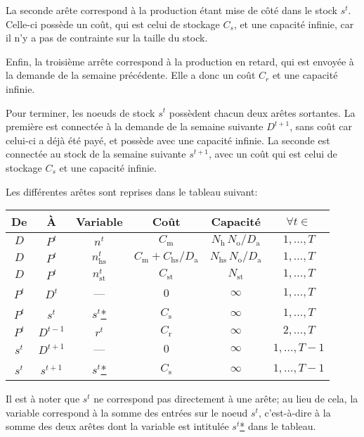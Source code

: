 La seconde arête correspond à la production étant mise de côté dans le stock $s^t$. Celle-ci possède un coût, qui est celui de stockage $C_s$, et une capacité infinie, car il n'y a pas de contrainte sur la taille du stock.

Enfin, la troisième arrête correspond à la production en retard, qui est envoyée à la demande de la semaine précédente. Elle a donc un coût $C_r$ et une capacité infinie.

Pour terminer, les noeuds de stock $s^t$ possèdent chacun deux arêtes sortantes. La première est connectée à la demande de la semaine suivante $D^{t+1}$, sans coût car celui-ci a déjà été payé, et possède avec une capacité infinie. La seconde est connectée au stock de la semaine suivante $s^{t+1}$, avec un coût qui est celui de stockage $C_s$ et une capacité infinie.

Les différentes arêtes sont reprises dans le tableau suivant:
\begin{center}
\begin{tabular}{cc|c|cc|c}
    \textbf{De} & \textbf{À} & \textbf{Variable} & \textbf{Coût} & \textbf{Capacité} & $\forall t \in$ \\
    \hline
    $D$ & $P^t$ &
    $n^t$ & $C_\mathrm{m}$ & $N_\mathrm{h}\,N_\mathrm{o}/D_\mathrm{a}$
    & $1,\dots,T$ \\
    \hline
    $D$ & $P^t$ &
    $n_\mathrm{hs}^t$ & $C_\mathrm{m}+C_\mathrm{hs}/D_\mathrm{a}$ & $N_\mathrm{hs}\,N_\mathrm{o}/D_\mathrm{a}$
    & $1,\dots,T$ \\
    \hline
    $D$ & $P^t$ &
    $n_\mathrm{st}^t$ & $C_\mathrm{st}$ & $N_\mathrm{st}$
    & $1,\dots,T$ \\
    
    \hline
    $P^t$ & $D^t$ &
    --- & $0$ & $\infty$
    & $1,\dots,T$ \\
    \hline
    $P^t$ & $s^t$ &
    $s^t$\;\underline{*} & $C_\mathrm{s}$ & $\infty$
    & $1,\dots,T$ \\
    \hline
    $P^t$ & $D^{t-1}$ &
    $r^t$ & $C_\mathrm{r}$ & $\infty$
    & $2,\dots,T$ \\
    
    \hline
    $s^t$ & $D^{t+1}$ &
    --- & $0$ & $\infty$
    & $1,\dots,T-1$ \\
    \hline
    $s^t$ & $s^{t+1}$ &
    $s^t$\;\underline{*} & $C_\mathrm{s}$ & $\infty$
    & $1,\dots,T-1$ \\
\end{tabular}
\end{center}

Il est à noter que $s^t$ ne correspond pas directement à une arête; au lieu de cela, la variable correspond à la somme des entrées sur le noeud $s^t$, c'est-à-dire à la somme des deux arêtes dont la variable est intitulée \og{}$s^t$\;\underline{*}\fg{} dans le tableau.
